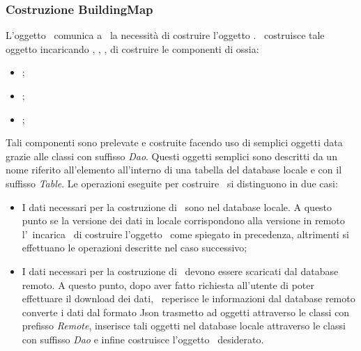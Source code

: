 \documentclass[../Funzionalita.tex]{subfiles}
\begin{document}
			
		\subsubsection{Costruzione BuildingMap}
			L'oggetto \InformationManagerImp\ comunica a \DatabaseService\ la necessità di costruire l'oggetto \BuildingMap. \DatabaseService\ costruisce tale oggetto incaricando \PointOfInterestService, \RegionOfInterestService, \EdgeService, \PhotoService di costruire le componenti di \BuildingMap ossia:
			\begin{itemize}
				\item \PointOfInterest;
				\item \RegionOfInterest;
				\item \EnrichedEdge;
			\end{itemize}
			Tali componenti sono prelevate e costruite facendo uso di semplici oggetti data grazie alle classi con suffisso \textit{Dao}. Questi oggetti semplici sono descritti da un nome riferito all'elemento all'interno di una tabella del database locale e con il suffisso \textit{Table}. 
			Le operazioni eseguite per costruire \BuildingMap\ si distinguono in due casi:
			\begin{itemize}
				\item I dati necessari per la costruzione di \BuildingMap\ sono nel database locale. A questo punto se la versione dei dati in locale corrispondono alla versione in remoto l'\InformationManagerImp\ incarica \DatabaseService\ di costruire l'oggetto \BuildingMap\ come spiegato in precedenza, altrimenti si effettuano le operazioni descritte nel caso successivo;
				\item I dati necessari per la costruzione di \BuildingMap\ devono essere scaricati dal database remoto. A questo punto, dopo aver fatto richiesta all'utente di poter effettuare il download dei dati, \DatabaseService\ reperisce le informazioni dal database remoto converte i dati dal formato Json trasmetto ad oggetti attraverso le classi con prefisso \textit{Remote}, inserisce tali oggetti nel database locale attraverso le classi con suffisso \textit{Dao} e infine costruisce l'oggetto \BuildingMap\ desiderato.
			\end{itemize}
			
		
\end{document}
